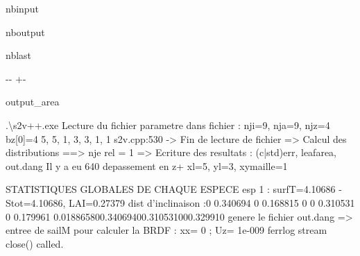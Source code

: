\documentclass[letterpaper,10pt,english]{sphinxmanual}
\begin{document}
\begin{sphinxuseclass}{nbinput}
{
\begin{sphinxVerbatim}[commandchars=\\\{\}]
\llap{\color{nbsphinxin}[12]:\,\hspace{\fboxrule}\hspace{\fboxsep}}    
    
       
         
\end{sphinxVerbatim}
}

\end{sphinxuseclass}
\begin{sphinxuseclass}{nboutput}
\begin{sphinxuseclass}{nblast}
{

\kern-\sphinxverbatimsmallskipamount\kern-\baselineskip
\kern+\FrameHeightAdjust\kern-\fboxrule
\vspace{\nbsphinxcodecellspacing}

\begin{sphinxuseclass}{output_area}
\begin{sphinxuseclass}{}


\begin{sphinxVerbatim}[commandchars=\\\{\}]
.\textbackslash{}s2v++.exe
Lecture du fichier parametre dans fichier :
nji=9, nja=9, njz=4
bz[0]=4
5, 5, 1, 3, 3, 1, 1
s2v.cpp:530 -> Fin de lecture de fichier
=> Calcul des distributions
==> nje rel = 1
=> Ecriture des resultats : (c|std)err, leafarea, out.dang
Il y a eu 640 depassement en z+
xl=5, yl=3, xymaille=1

STATISTIQUES GLOBALES DE CHAQUE ESPECE
esp 1 : surfT=4.10686 - Stot=4.10686, LAI=0.27379 dist d'inclinaison :0 0.340694 0 0.168815 0 0 0.310531 0 0.179961
0.018865800.34069400.310531000.329910
genere le fichier out.dang => entree de sailM pour calculer la BRDF
        : xx= 0 ; Uz= 1e-009
ferrlog stream close() called.
\end{sphinxVerbatim}



\end{sphinxuseclass}
\end{sphinxuseclass}
}

\end{sphinxuseclass}
\end{sphinxuseclass}
\end{document}
